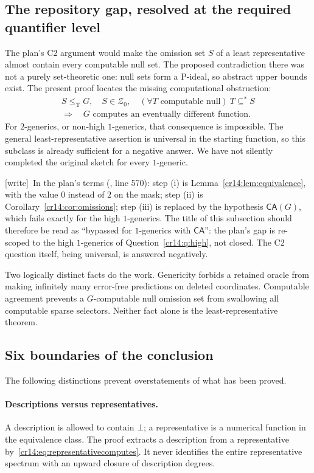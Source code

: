 \documentclass[11pt,a4paper]{article}
\newcommand{\leT}{\leq_{\mathrm T}}
\newcommand{\Znull}{\mathcal Z_0}
\newcommand{\substar}{\subseteq^{*}}
\newcommand{\CA}{\mathsf{CA}}
\theoremstyle{definition}
\theoremstyle{remark}
\newcommand{\wtag}{\textup{[write]}}
\begin{document}
\subsection{The repository gap, resolved at the required quantifier level}\label{cr14:sec:gap}
The plan's C2 argument would make the omission set $S$ of a least
representative almost contain every computable null set. The proposed
contradiction there was not a purely set-theoretic one: null sets form a
P-ideal, so abstract upper bounds exist.\cite{ProveIt}
The present proof locates the missing computational obstruction:
\[
 \begin{gathered}
 S\leT G,\quad S\in\Znull,\quad
 (\forall T\text{ computable null})\ T\substar S\\[2pt]
 \Longrightarrow\quad
 \text{$G$ computes an eventually different function.}
 \end{gathered}
\]
For $2$-generics, or non-high $1$-generics, that consequence is impossible.
The general least-representative assertion is universal in the starting
function, so this subclass is already sufficient for a negative answer.
We have not silently completed the original sketch for every $1$-generic.

\noindent\wtag\ In the plan's terms (,
line 570): step (i) is Lemma~\ref{cr14:lem:equivalence}, with the value $0$
instead of $2$ on the mask; step (ii) is
Corollary~\ref{cr14:cor:omissions}; step (iii) is replaced by the
hypothesis $\CA(G)$, which fails exactly for the high $1$-generics. The
title of this subsection should therefore be read as ``bypassed for
$1$-generics with $\CA$'': the plan's gap is re-scoped to the high
$1$-generics of Question~\ref{cr14:q:high}, not closed. The C2 question
itself, being universal, is answered negatively.

Two logically distinct facts do the work. Genericity forbids a retained
oracle from making infinitely many error-free predictions on deleted
coordinates. Computable agreement prevents a $G$-computable null omission
set from swallowing all computable sparse selectors. Neither fact alone is
the least-representative theorem.

\subsection{Six boundaries of the conclusion}
The following distinctions prevent overstatements of what has been proved.

\paragraph{Descriptions versus representatives.}
A description is allowed to contain $\bot$; a representative is a numerical
function in the equivalence class. The proof extracts a description from a
representative by~\eqref{cr14:eq:representativecomputes}. It never identifies
the entire representative spectrum with an upward closure of description
degrees.
\end{document}
